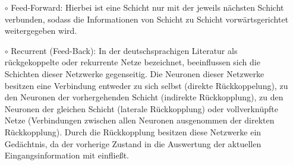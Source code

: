 \begin{itemize}
\item[\textbf{$\circ$}] Feed-Forward: Hierbei ist eine Schicht nur mit der jeweils nächsten Schicht verbunden, sodass die Informationen von Schicht zu Schicht vorwärtsgerichtet weitergegeben wird.

\item[\textbf{$\circ$}] Recurrent (Feed-Back): In der deutschsprachigen Literatur als rückgekoppelte oder rekurrente Netze bezeichnet, beeinflussen sich die Schichten dieser Netzwerke gegenseitig. Die Neuronen dieser Netzwerke besitzen eine Verbindung entweder zu sich selbst (direkte Rückkoppelung), zu den Neuronen der vorhergehenden Schicht (indirekte Rückkopplung), zu den Neuronen der gleichen Schicht (laterale Rückkopplung) oder vollverknüpfte Netze (Verbindungen zwischen allen Neuronen ausgenommen der direkten Rückkopplung). Durch die Rückkopplung besitzen diese Netzwerke ein \glqq Gedächtnis\grqq , da der vorherige Zustand in die Auswertung der aktuellen Eingangsinformation mit einfließt.
\end{itemize}



